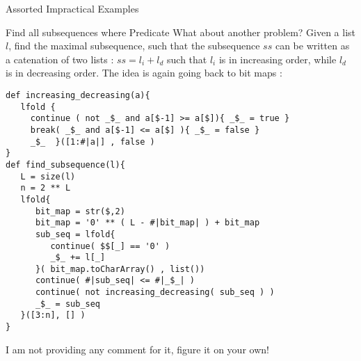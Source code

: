 \begin{section}{Assorted Impractical Examples}
\begin{subsection}{Find all subsequences where Predicate }
What about another problem? Given a list $l$, find the maximal subsequence, 
such that the subsequence $ss$ can be written as a catenation of two lists : $ss = l_i + l_d$
such that $l_i$ is in increasing order, while $l_d$ is in decreasing order.
The idea is again going back to bit maps :

\begin{center}\begin{minipage}{\linewidth}
\begin{lstlisting}[style=JexlStyle]
def increasing_decreasing(a){
   lfold {
     continue ( not _$_ and a[$-1] >= a[$]){ _$_ = true }
     break( _$_ and a[$-1] <= a[$] ){ _$_ = false }
     _$_  }([1:#|a|] , false )
}
def find_subsequence(l){
   L = size(l) 
   n = 2 ** L
   lfold{
      bit_map = str($,2)
      bit_map = '0' ** ( L - #|bit_map| ) + bit_map
      sub_seq = lfold{
         continue( $$[_] == '0' )
         _$_ += l[_]  
      }( bit_map.toCharArray() , list())
      continue( #|sub_seq| <= #|_$_| )
      continue( not increasing_decreasing( sub_seq ) )
      _$_ = sub_seq
   }([3:n], [] ) 
}
\end{lstlisting}  
\end{minipage}\end{center} 

I am not providing any comment for it, figure it on your own!


\end{subsection}



\end{section}




